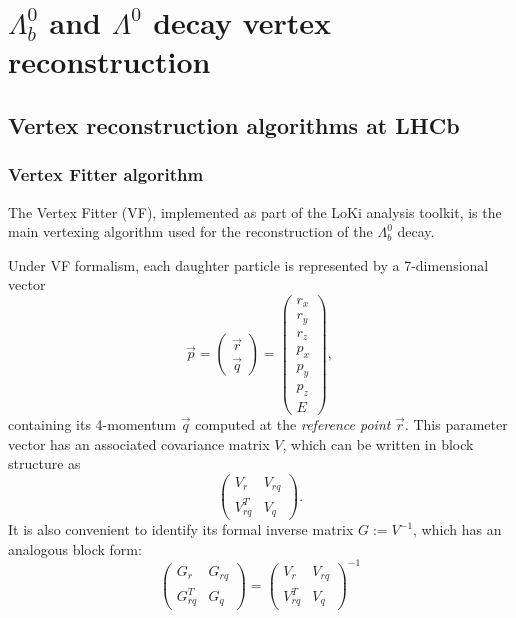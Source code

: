\chapter{\texorpdfstring{$\Lambda_b^0$}{Lambdab} and \texorpdfstring{$\Lambda^0$}{Lambda} decay vertex reconstruction}
\label{cap:vertex_reconstruction}

\section{Vertex reconstruction algorithms at LHCb}
\subsection{Vertex Fitter algorithm}
The Vertex Fitter (VF), implemented as part of the LoKi analysis toolkit, is the main vertexing algorithm used for the reconstruction of the $\Lambda_b^0$ decay.

Under VF formalism, each daughter particle is represented by a 7-dimensional vector
\begin{equation}
	\vec{p} = \begin{pmatrix}
		\vec{r} \\ \vec{q}
	\end{pmatrix}
	=
	\begin{pmatrix}
		r_x \\ r_y \\ r_z \\ p_x \\ p_y \\ p_z \\ E
	\end{pmatrix},
	\label{eq:particle_representation}
\end{equation}
containing its 4-momentum $\vec{q}$ computed at the \textit{reference point} $\vec{r}$.
This parameter vector has an associated covariance matrix $V$, which can be written in block structure as
\begin{equation}
	\begin{pmatrix}
		V_r      & V_{rq} \\
		V_{rq}^T & V_q
	\end{pmatrix}.
	\label{eq:par_covmatrix}
\end{equation}
It is also convenient to identify its formal inverse matrix $G := V^{-1}$, which has an analogous block form:
\begin{equation}
	\begin{pmatrix}
		G_r      & G_{rq} \\
		G_{rq}^T & G_q
	\end{pmatrix}
	=
	\begin{pmatrix}
		V_r      & V_{rq} \\
		V_{rq}^T & V_q
	\end{pmatrix}^{-1}
\end{equation}

